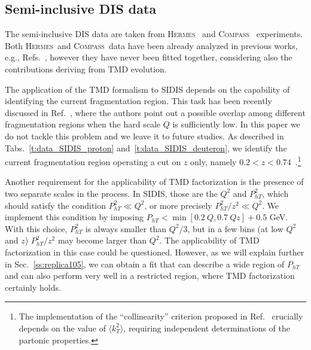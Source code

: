 \documentclass[aps,preprintnumbers,showpacs,nofootinbib,superscriptaddress,floatfix]{revtex4}
\newcommand{\hermes}{\textsc{Hermes}}
\newcommand{\compass}{\textsc{Compass}}
\begin{document}
 
\subsection{Semi-inclusive DIS data}
\label{ss:SIDIS data}

The semi-inclusive DIS data are taken from \hermes~\cite{Airapetian:2012ki} and \compass~\cite{Adolph:2013stb} experiments. 
Both \hermes\ and \compass\ data have been already analyzed in previous works,
e.g., Refs.~\cite{Signori:2013mda,Anselmino:2013lza}, 
however they have never been
fitted together, considering also the contributions deriving from TMD
evolution. 

The application of the TMD formalism to SIDIS depends on the capability of
identifying the current fragmentation region. This task has been recently
discussed in Ref.~\cite{Boglione:2016bph}, where the authors point out a
possible overlap among different  fragmentation regions when the hard scale
$Q$ is sufficiently low.  
In this paper we do not tackle this problem and we leave it to future
studies. As described in Tabs.~\ref{t:data_SIDIS_proton}
and~\ref{t:data_SIDIS_deuteron}, we identify the current fragmentation region
operating a cut on $z$ only, namely $0.2 < z < 0.74$\ .\footnote{The
  implementation of the ``collinearity'' criterion proposed
  in Ref.~\cite{Boglione:2016bph} crucially depends on the value of $\langle k_T^2
  \rangle$, requiring independent determinations of the partonic
  properties.} 

Another requirement for the applicability of TMD factorization is the presence
of two separate scales in the process. In SIDIS, those are the $Q^2$ and
$P_{hT}^2$, which should satisfy the condition $P_{hT}^2 \ll Q^2$, or more
precisely  $P_{hT}^2/z^2 \ll Q^2$. 
We implement this condition by imposing 
$P_{hT} < \min[0.2\ Q, 0.7\ Qz] + 0.5$ GeV.
With this choice, $P_{hT}^2$ is always smaller than $Q^2/3$, but in a few 
bins (at low $Q^2$ and $z$) $P_{hT}^2/z^2$ may become larger
than $Q^2$. The applicability of TMD factorization in this case could be
questioned. However, as we will explain further in Sec.~\ref{ss:replica105},
we can obtain a fit that can describe a wide region of $P_{hT}$ and can also
perform very well in a restricted region,  where TMD factorization
certainly holds.
\end{document}
